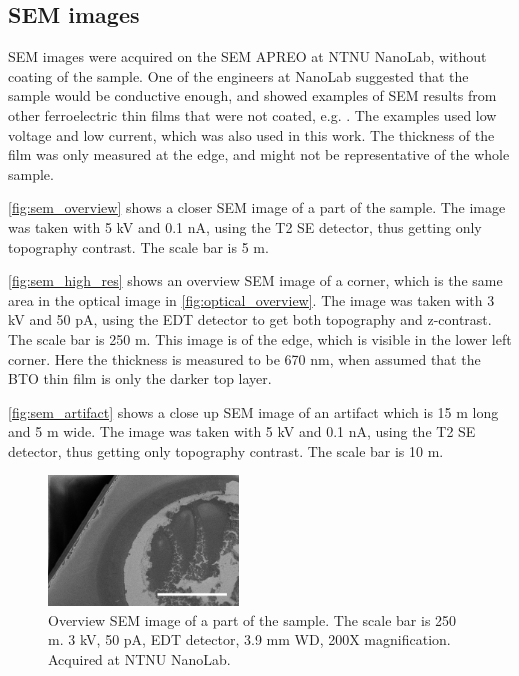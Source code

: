 \subsection{SEM images}
\label{results:SEM}

SEM images were acquired on the SEM APREO at NTNU NanoLab, without coating of the sample.
One of the engineers at NanoLab suggested that the sample would be conductive enough, and showed examples of SEM results from other ferroelectric thin films that were not coated, e.g. \cite{hunnestad_visualizing_2019}.
The examples used low voltage and low current, which was also used in this work.
The thickness of the film was only measured at the edge, and might not be representative of the whole sample.

\autoref{fig:sem_overview} shows a closer SEM image of a part of the sample.
The image was taken with 5 kV and 0.1 nA, using the T2 SE detector, thus getting only topography contrast.
The scale bar is 5 \textmu m.

\autoref{fig:sem_high_res} shows an overview SEM image of a corner, which is the same area in the optical image in \autoref{fig:optical_overview}.
The image was taken with 3 kV and 50 pA, using the EDT detector to get both topography and z-contrast.
The scale bar is 250 \textmu m.
This image is of the edge, which is visible in the lower left corner.
Here the thickness is measured to be 670 nm, when assumed that the BTO thin film is only the darker top layer.

\autoref{fig:sem_artifact} shows a close up SEM image of an artifact which is 15 \textmu m long and 5 \textmu m wide.
The image was taken with 5 kV and 0.1 nA, using the T2 SE detector, thus getting only topography contrast.
The scale bar is 10 \textmu m.

\begin{figure}[ht]
    \centering
    \includegraphics[width=0.45\textwidth]{figures/sem_overview_250um.jpg}
    \caption{Overview SEM image of a part of the sample.
        The scale bar is 250 \textmu m.
        3 kV, 50 pA, EDT detector, 3.9 mm WD, 200X magnification.
        Acquired at NTNU NanoLab.
    }
    \label{fig:sem_overview}
\end{figure}

